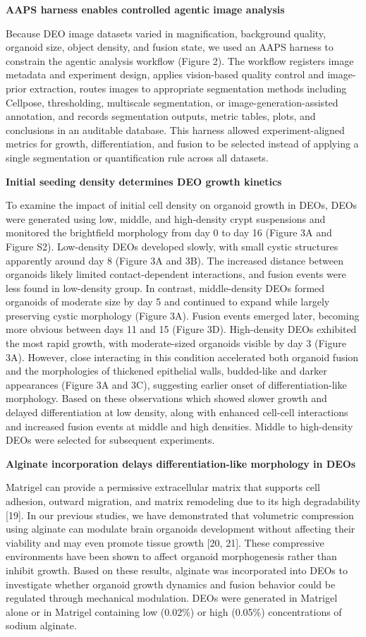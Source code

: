 \documentclass[
]{article}
\begin{document}
\textbf{AAPS harness enables controlled agentic image analysis}

Because DEO image datasets varied in magnification, background quality, organoid size, object density, and fusion state, we used an AAPS harness to constrain the agentic analysis workflow (Figure 2). The workflow registers image metadata and experiment design, applies vision-based quality control and image-prior extraction, routes images to appropriate segmentation methods including Cellpose, thresholding, multiscale segmentation, or image-generation-assisted annotation, and records segmentation outputs, metric tables, plots, and conclusions in an auditable database. This harness allowed experiment-aligned metrics for growth, differentiation, and fusion to be selected instead of applying a single segmentation or quantification rule across all datasets.

\textbf{Initial seeding density determines DEO growth kinetics}

To examine the impact of initial cell density on organoid growth in DEOs, DEOs were generated using low, middle, and high-density crypt suspensions and monitored the brightfield morphology from day 0 to day 16 (Figure 3A and Figure S2). Low-density DEOs developed slowly, with small cystic structures apparently around day 8 (Figure 3A and 3B). The increased distance between organoids likely limited contact-dependent interactions, and fusion events were less found in low-density group. In contrast, middle-density DEOs formed organoids of moderate size by day 5 and continued to expand while largely preserving cystic morphology (Figure 3A). Fusion events emerged later, becoming more obvious between days 11 and 15 (Figure 3D). High-density DEOs exhibited the most rapid growth, with moderate-sized organoids visible by day 3 (Figure 3A). However, close interacting in this condition accelerated both organoid fusion and the morphologies of thickened epithelial walls, budded-like and darker appearances (Figure 3A and 3C), suggesting earlier onset of differentiation-like morphology. Based on these observations which showed slower growth and delayed differentiation at low density, along with enhanced cell-cell interactions and increased fusion events at middle and high densities. Middle to high-density DEOs were selected for subsequent experiments.

\textbf{Alginate incorporation delays differentiation-like morphology in DEOs}

Matrigel can provide a permissive extracellular matrix that supports cell adhesion, outward migration, and matrix remodeling due to its high degradability {[}19{]}. In our previous studies, we have demonstrated that volumetric compression using alginate can modulate brain organoids development without affecting their viability and may even promote tissue growth {[}20, 21{]}. These compressive environments have been shown to affect organoid morphogenesis rather than inhibit growth. Based on these results, alginate was incorporated into DEOs to investigate whether organoid growth dynamics and fusion behavior could be regulated through mechanical modulation. DEOs were generated in Matrigel alone or in Matrigel containing low (0.02\%) or high (0.05\%) concentrations of sodium alginate.
\end{document}
